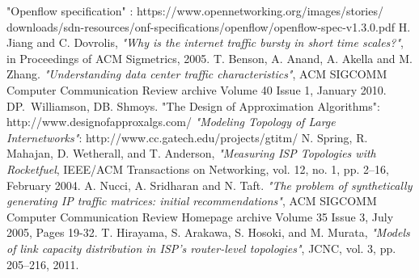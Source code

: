 \documentclass[conference]{IEEEtran}
\begin{document}
\begin{thebibliography}{1}
"Openflow specification" : https://www.opennetworking.org/images/stories/\\downloads/sdn-resources/onf-specifications/openflow/openflow-spec-v1.3.0.pdf
H. Jiang and C. Dovrolis, \emph{"Why is the internet traffic bursty in short time scales?"}, in Proceedings of ACM Sigmetrics, 2005.
T. Benson, A. Anand,  A. Akella and M. Zhang. \emph{"Understanding data center traffic characteristics"}, ACM SIGCOMM Computer Communication Review archive Volume 40 Issue 1, January 2010.
DP.~Williamson, DB. Shmoys. "The Design of Approximation Algorithms": http://www.designofapproxalgs.com/ 
\emph{"Modeling Topology of Large Internetworks"}: http://www.cc.gatech.edu/projects/gtitm/
N. Spring, R. Mahajan, D. Wetherall, and T. Anderson, \emph{"Measuring ISP
Topologies with Rocketfuel}, IEEE/ACM Transactions on Networking, vol. 12, no. 1, pp. 2–16, February 2004.
A. Nucci, A. Sridharan and N. Taft. \emph{"The problem of synthetically generating IP traffic matrices: initial recommendations"}, ACM SIGCOMM Computer Communication Review Homepage archive
Volume 35 Issue 3, July 2005, Pages 19-32. 
T. Hirayama, S. Arakawa, S. Hosoki, and M. Murata, \emph{"Models of link
capacity distribution in ISP’s router-level topologies"}, JCNC, vol. 3, pp. 205–216, 2011.
 
\end{thebibliography}
\end{document}
